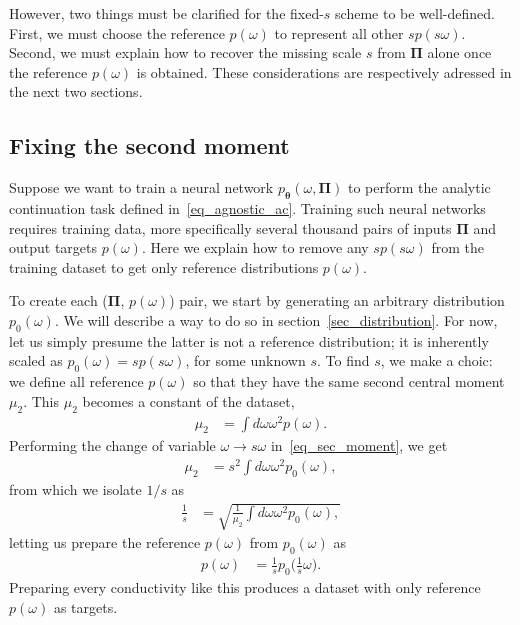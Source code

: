 \documentclass[notitlepage,11pt,nofootinbib]{revtex4-1}
\renewcommand{\vec}[1]{\bm{#1}}
\begin{document}
However, two things must be clarified for the fixed-$s$ scheme to be well-defined. First, we must choose the reference $p(\omega)$ to represent all other $sp(s\omega)$. Second,
we must explain how to recover the missing scale $s$ from $\vec \Pi$ alone once the reference $p(\omega)$ is obtained. These considerations are respectively adressed in the next two sections.

\subsection{Fixing the second moment}
\label{sec_data_rescaling}
Suppose we want to train a neural network $p_{\vec \theta}(\omega, \vec \Pi)$ to perform the analytic continuation task defined in~\eqref{eq_agnostic_ac}. Training such neural networks requires training data, more specifically several thousand pairs of inputs $\vec \Pi$ and output targets $p(\omega)$. Here we explain how to remove any $sp(s\omega)$ from the training dataset to get only reference distributions $p(\omega)$.

To create each ($\vec \Pi$, $p(\omega)$) pair, we start by generating an arbitrary distribution $p_0(\omega)$. We will describe a way to do so in section~\ref{sec_distribution}. For now, let us simply presume the latter is not a reference distribution; it is inherently scaled as $p_0(\omega)=sp(s\omega)$, for some unknown $s$.
To find $s$, we make a choic: we define all reference $p(\omega)$ so that they have the same second central moment $\mu_2$. This $\mu_2$ becomes a constant of the dataset,
\begin{align}
\mu_2
&=
\int d\omega \omega^2 p(\omega).
\label{eq_sec_moment}
\end{align}
Performing the change of variable $\omega \rightarrow s\omega$ in~\eqref{eq_sec_moment}, we get
\begin{align}
\mu_2&=
s^2 \int d\omega \omega^2 p_0(\omega),
\end{align}
from which we isolate $1/s$ as
\begin{align}
\frac{1}{s}
&=
\sqrt{
\frac{1}{\mu_2}
\int d\omega \omega^2 p_0(\omega),
}
\end{align}
letting us prepare the reference $p(\omega)$ from $p_0(\omega)$ as
\begin{align}
p(\omega) 
&=
\frac{1}{s}p_0\big(\frac{1}{s}\omega\big).
\end{align}
Preparing every conductivity like this produces a dataset with only reference $p(\omega)$ as targets.
\end{document}
